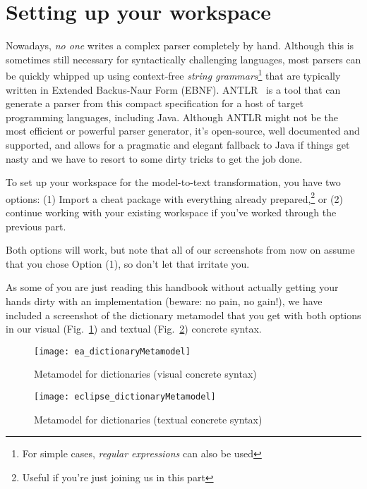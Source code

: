 \newpage
\section{Setting up your workspace}
\genHeader

Nowadays, \emph{no one} writes a complex parser completely by hand. Although this is sometimes still necessary for syntactically challenging languages, most
parsers can be quickly whipped up using context-free \emph{string grammars}\footnote{For simple cases, \emph{regular expressions} can also be used} that are
typically written in Extended Backus-Naur Form (EBNF). ANTLR~\cite{ANTLR} is a tool that can generate a parser from this compact specification for
a host of target programming languages, including Java. Although ANTLR might not be the most efficient or powerful parser generator, it's open-source, well
documented and supported, and allows for a pragmatic and elegant fallback to Java if things get nasty and we have to resort to some dirty tricks to get the job
done.

To set up your workspace for the model-to-text transformation, you have two options: (1) Import a cheat package with everything already
prepared,\footnote{Useful if you're just joining us in this part} or (2) continue working with your existing workspace if you've worked through the previous
part.

Both options will work, but note that all of our screenshots from now on assume that you chose Option (1), so don't let that irritate you.

As some of you are just reading this handbook without actually getting your hands dirty with an implementation (beware: no pain, no gain!), we have included a
screenshot of the dictionary metamodel that you get with both options in our visual (Fig.~\ref{ea:dictLang}) and textual (Fig.~\ref{eclipse:dictLangMetamodel})
concrete syntax.

\begin{figure}[htbp]
  \hspace{-1cm}
  \texttt{[image: ea\_dictionaryMetamodel]}
  \caption{Metamodel for dictionaries (visual concrete syntax)}
  \label{ea:dictLang}
\end{figure}

\vspace{0.5cm}

\begin{figure}[h!]
  \hspace{-1cm}
  \texttt{[image: eclipse\_dictionaryMetamodel]}
  \caption{Metamodel for dictionaries (textual concrete syntax)}
  \label{eclipse:dictLangMetamodel}
\end{figure}


